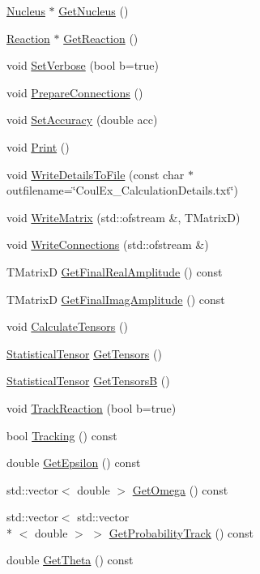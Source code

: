\begin{DoxyCompactItemize}
\item 
\hyperlink{classNucleus}{Nucleus} $\ast$ \hyperlink{classPointCoulEx_a0190b4e42074c4198e80f3403d25b14e}{Get\-Nucleus} ()
\item 
\hyperlink{classReaction}{Reaction} $\ast$ \hyperlink{classPointCoulEx_a4369d10a2ab275ffd79800f4b2946345}{Get\-Reaction} ()
\item 
void \hyperlink{classPointCoulEx_afd63f7b47fc6fb5f49906911cb212b38}{Set\-Verbose} (bool b=true)
\item 
void \hyperlink{classPointCoulEx_a1bfa7f85286b1da3c4f0622ee35d0087}{Prepare\-Connections} ()
\item 
void \hyperlink{classPointCoulEx_a80b13791f6bfd42e2ab75895e1617ee3}{Set\-Accuracy} (double acc)
\item 
void \hyperlink{classPointCoulEx_aa6006da1bca6a0bc677c4fb23ba38dcd}{Print} ()
\item 
void \hyperlink{classPointCoulEx_a409e44329209abf7d2e4bfc794b2bb1e}{Write\-Details\-To\-File} (const char $\ast$outfilename=\char`\"{}Coul\-Ex\-\_\-\-Calculation\-Details.\-txt\char`\"{})
\item 
void \hyperlink{classPointCoulEx_aa7fa9cd089c327c59eef9ec4e7f46e0e}{Write\-Matrix} (std\-::ofstream \&, T\-Matrix\-D)
\item 
void \hyperlink{classPointCoulEx_a8786b398bd1d6d790f203c87cef957cc}{Write\-Connections} (std\-::ofstream \&)
\item 
T\-Matrix\-D \hyperlink{classPointCoulEx_aa53de9a5ae2bd43ef3b3287cffaccc67}{Get\-Final\-Real\-Amplitude} () const 
\item 
T\-Matrix\-D \hyperlink{classPointCoulEx_a13792d4d252f16cd4c1bb881757dea30}{Get\-Final\-Imag\-Amplitude} () const 
\item 
void \hyperlink{classPointCoulEx_a276ea0591ad200fbd40a53ac80c61634}{Calculate\-Tensors} ()
\item 
\hyperlink{classStatisticalTensor}{Statistical\-Tensor} \hyperlink{classPointCoulEx_a08232c7aba802b4820dc3859bf183a2e}{Get\-Tensors} ()
\item 
\hyperlink{classStatisticalTensor}{Statistical\-Tensor} \hyperlink{classPointCoulEx_af4dca3329edc2696b088140eceef5bda}{Get\-Tensors\-B} ()
\item 
void \hyperlink{classPointCoulEx_aa03b7b60a372846b772659ff1b16c246}{Track\-Reaction} (bool b=true)
\item 
bool \hyperlink{classPointCoulEx_a65c1db61988871c76583e54d52b721ec}{Tracking} () const 
\item 
double \hyperlink{classPointCoulEx_a1e1d91eff35bba0a4ed36610a8644638}{Get\-Epsilon} () const 
\item 
std\-::vector$<$ double $>$ \hyperlink{classPointCoulEx_a2f447409074ae1105d54bcdf4aaad3fd}{Get\-Omega} () const 
\item 
std\-::vector$<$ std\-::vector\\*
$<$ double $>$ $>$ \hyperlink{classPointCoulEx_a5324fc5b5d28c980ae0919bb7de6bb02}{Get\-Probability\-Track} () const 
\item 
double \hyperlink{classPointCoulEx_a593fc5d2387da403ffaa6ceb12527ba0}{Get\-Theta} () const 
\end{DoxyCompactItemize}


